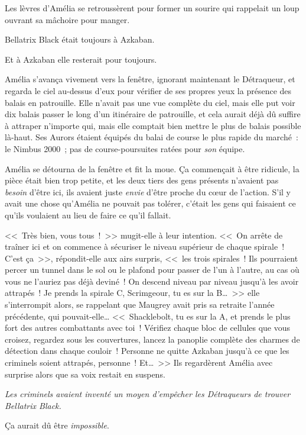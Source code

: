 Les lèvres d'Amélia se retroussèrent pour former un sourire qui rappelait un loup ouvrant sa mâchoire pour manger.

Bellatrix Black était toujours à Azkaban.

Et à Azkaban elle resterait pour toujours.

Amélia s'avança vivement vers la fenêtre, ignorant maintenant le Détraqueur, et regarda le ciel au-dessus d'eux pour vérifier de ses propres yeux la présence des balais en patrouille. Elle n'avait pas une vue complète du ciel, mais elle put voir dix balais passer le long d'un itinéraire de patrouille, et cela aurait déjà dû suffire à attraper n'importe qui, mais elle comptait bien mettre le plus de balais possible là-haut. Ses Aurors étaient équipés du balai de course le plus rapide du marché~: le Nimbus 2000~; pas de course-poursuites ratées pour \emph{son} équipe.

Amélia se détourna de la fenêtre et fit la moue. Ça commençait à être ridicule, la pièce était bien trop petite, et les deux tiers des gens présents n'avaient pas \emph{besoin} d'être ici, ils avaient juste \emph{envie} d'être proche du cœur de l'action. S'il y avait une chose qu'Amélia ne pouvait pas tolérer, c'était les gens qui faisaient ce qu'ils voulaient au lieu de faire ce qu'il fallait.

<<~Très bien, vous tous~!~>> mugit-elle à leur intention. <<~On arrête de traîner ici et on commence à sécuriser le niveau supérieur de chaque spirale~! C'est ça~>>, répondit-elle aux airs surpris, <<~les trois spirales~! Ils pourraient percer un tunnel dans le sol ou le plafond pour passer de l'un à l'autre, au cas où vous ne l'auriez pas déjà deviné~! On descend niveau par niveau jusqu'à les avoir attrapés~! Je prends la spirale C, Scrimgeour, tu es sur la B…~>> elle s'interrompit alors, se rappelant que Maugrey avait pris sa retraite l'année précédente, qui pouvait-elle… <<~Shacklebolt, tu es sur la A, et prends le plus fort des autres combattants avec toi~! Vérifiez chaque bloc de cellules que vous croisez, regardez sous les couvertures, lancez la panoplie complète des charmes de détection dans chaque couloir~! Personne ne quitte Azkaban jusqu'à ce que les criminels soient attrapés, personne~! Et…~>> Ils regardèrent Amélia avec surprise alors que sa voix restait en suspens.

\emph{Les criminels avaient inventé un moyen d'empêcher les Détraqueurs de trouver Bellatrix Black.}

Ça aurait dû être \emph{impossible}.


